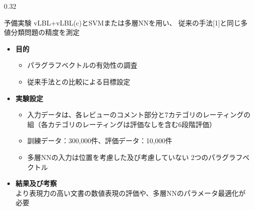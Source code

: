 \documentclass[8pt,unicode]{beamer}
\newcommand{\columnscale}{0.32}
\newcommand{\itemtitle}[1]{\textbf{#1} \\}
\begin{document}
\begin{frame}{}
\begin{columns}[t]
\begin{column}{\columnscale\textwidth} %
  \begin{block}{予備実験}
    vLBL+vLBL(c)とSVMまたは多層NNを用い、
    従来の手法[1]と同じ多値分類問題の精度を測定

    \begin{itemize}
      \item \itemtitle{目的}
      \begin{itemize}
        \item パラグラフベクトルの有効性の調査
        \item 従来手法との比較による目標設定
      \end{itemize}

      \item \itemtitle{実験設定}
      \begin{itemize}
        \item 入力データは、各レビューのコメント部分と7カテゴリのレーティングの
        組（各カテゴリのレーティングは評価なしを含む6段階評価）
        \item 訓練データ：300,000件、評価データ：10,000件
        \item 多層NNの入力は位置を考慮した及び考慮していない
        2つのパラグラフベクトル
      \end{itemize}

      \item \itemtitle{結果及び考察}
        より表現力の高い文書の数値表現の評価や、多層NNのパラメータ最適化が必要


    \end{itemize}


\end{block}
\end{column}
\end{columns}
\end{frame}
\end{document}
